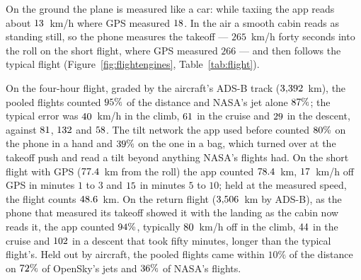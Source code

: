\documentclass[11pt]{article}
\begin{document}
\begin{table}[t]
\centering\small
\caption{Speed in the air. The four-hour flight against its ADS-B track (errors are the typical km/h in
the climb, the cruise and the descent), the short flight against GPS from the roll, and flights held out by
aircraft. $^a$As the phone in a hand recorded it, pauses by iOS included.}
\label{tab:flight}
\setlength{\tabcolsep}{3.6pt}

\end{table}

On the ground the plane is measured like a car: while taxiing the app reads about $13$~km/h where GPS
measured $18$. In the air a smooth cabin reads as standing still, so the phone measures the takeoff ---
$265$~km/h forty seconds into the roll on the short flight, where GPS measured $266$ --- and then follows the
typical flight (Figure~\ref{fig:flightengines}, Table~\ref{tab:flight}).

On the four-hour flight, graded by the aircraft's ADS-B track ($3{,}392$~km), the pooled flights counted
$95\%$ of the distance and NASA's jet alone $87\%$; the typical error was $40$~km/h in the climb,
$61$ in the cruise and $29$ in the descent, against $81$, $132$ and $58$. The tilt network the app used
before counted $80\%$ on the phone in a hand and $39\%$ on the one in a bag, which turned over at the
takeoff push and read a tilt beyond anything NASA's flights had. On the short flight with GPS
($77.4$~km from the roll) the app counted $78.4$~km, $17$~km/h off GPS in minutes $1$ to $3$ and
$15$ in minutes $5$ to $10$; held at the measured speed, the flight counts $48.6$~km. On the
return flight ($3{,}506$~km by ADS-B), as the phone that measured its takeoff showed it with the landing as the
cabin now reads it, the app counted $94\%$, typically $80$~km/h off in the climb, $44$ in the cruise
and $102$ in a descent that took fifty minutes, longer than the typical flight's. Held out by
aircraft, the pooled flights came within $10\%$ of the distance on $72\%$ of OpenSky's jets and $36\%$ of
NASA's flights.
\end{document}
